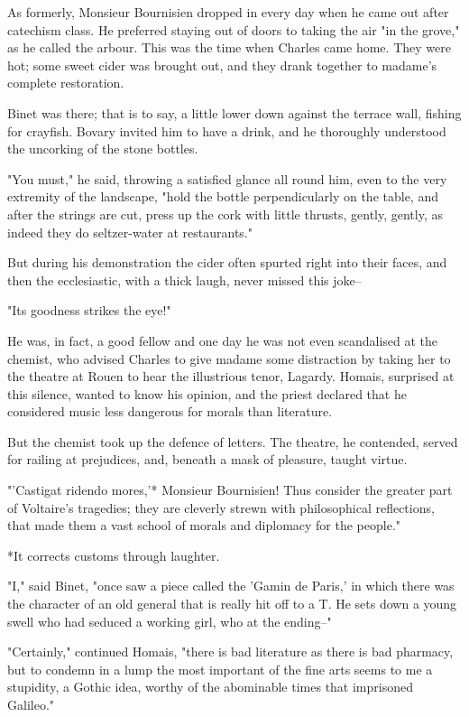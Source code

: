 \documentclass{tufte-book}
\begin{document}
As formerly, Monsieur Bournisien dropped in every day when he came out
after catechism class. He preferred staying out of doors to taking the
air "in the grove," as he called the arbour. This was the time when
Charles came home. They were hot; some sweet cider was brought out, and
they drank together to madame's complete restoration.

Binet was there; that is to say, a little lower down against the terrace
wall, fishing for crayfish. Bovary invited him to have a drink, and he
thoroughly understood the uncorking of the stone bottles.

"You must," he said, throwing a satisfied glance all round him, even to
the very extremity of the landscape, "hold the bottle perpendicularly on
the table, and after the strings are cut, press up the cork with
little thrusts, gently, gently, as indeed they do seltzer-water at
restaurants."

But during his demonstration the cider often spurted right into their
faces, and then the ecclesiastic, with a thick laugh, never missed this
joke--

"Its goodness strikes the eye!"

He was, in fact, a good fellow and one day he was not even scandalised
at the chemist, who advised Charles to give madame some distraction
by taking her to the theatre at Rouen to hear the illustrious tenor,
Lagardy. Homais, surprised at this silence, wanted to know his opinion,
and the priest declared that he considered music less dangerous for
morals than literature.

But the chemist took up the defence of letters. The theatre, he
contended, served for railing at prejudices, and, beneath a mask of
pleasure, taught virtue.

"'Castigat ridendo mores,'* Monsieur Bournisien! Thus consider the
greater part of Voltaire's tragedies; they are cleverly strewn with
philosophical reflections, that made them a vast school of morals and
diplomacy for the people."

     *It corrects customs through laughter.


"I," said Binet, "once saw a piece called the 'Gamin de Paris,' in which
there was the character of an old general that is really hit off to a
T. He sets down a young swell who had seduced a working girl, who at the
ending--"

"Certainly," continued Homais, "there is bad literature as there is bad
pharmacy, but to condemn in a lump the most important of the fine arts
seems to me a stupidity, a Gothic idea, worthy of the abominable times
that imprisoned Galileo."
\end{document}
